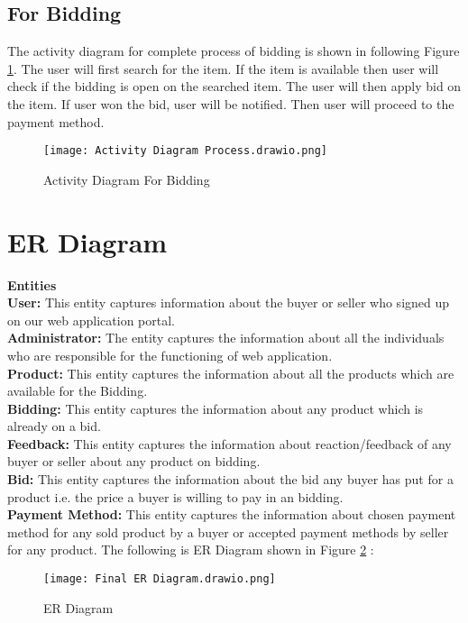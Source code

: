 \subsection{For Bidding}
The activity diagram for complete process of bidding is shown in following Figure \ref{fig:AD2}. The user will first search for the item. If the item is available then user will check if the bidding is open on the searched item. The user will then apply bid on the item. If user won the bid, user will be notified. Then user will proceed to the payment method.
\begin{figure}[!h]
    \centering
    \texttt{[image: Activity Diagram Process.drawio.png]}
    \caption{Activity Diagram For Bidding}
    \label{fig:AD2}
\end{figure}
\newpage
\section{ER Diagram}
\doublespacing
\textbf{Entities}
 \\
\textbf{User:} This entity captures information about the buyer or seller who signed up on our web application portal.\\
\textbf{Administrator:} The entity captures the information about all the individuals who are responsible for the functioning of web application.\\
\textbf{Product:} This entity captures the information about all the products which are available for the Bidding.\\
\textbf{Bidding:} This entity captures the information about any product which is already on a bid.\\
\textbf {Feedback:} This entity captures the information about reaction/feedback of any buyer or seller about any product on bidding.\\
\textbf{Bid:} This entity captures the information about the bid any buyer has put for a product i.e. the price a buyer is willing to pay in an bidding.\\
\textbf{Payment Method:} This entity captures the information about chosen payment method for any sold product by a buyer or accepted payment methods by seller for any product.
The following is ER Diagram shown in Figure \ref{fig:ER} :\\
\begin{figure}[!h]
    \centering
    \texttt{[image: Final ER Diagram.drawio.png]}
    \caption{ER Diagram}
    \label{fig:ER}
\end{figure}\\
\newpage
